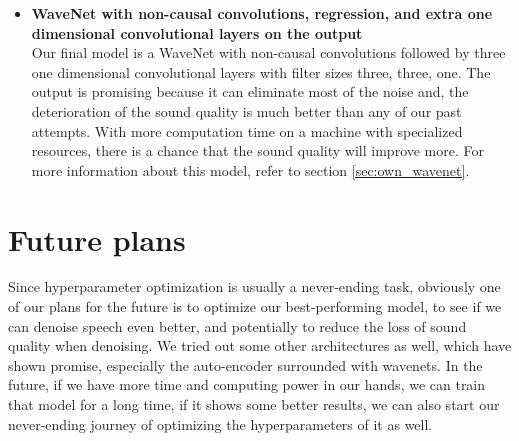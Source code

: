 \documentclass{article}
\begin{document}
\begin{itemize}
	\item \textbf{WaveNet with non-causal convolutions, regression, and extra one dimensional convolutional layers on the output} \\
	Our final model is a WaveNet with non-causal convolutions followed by three one dimensional convolutional layers with filter sizes three, three, one. The output is promising because it can eliminate most of the noise and, the deterioration of the sound quality is much better than any of our past attempts. With more computation time on a machine with specialized resources, there is a chance that the sound quality will improve more. For more information about this model, refer to section \ref{sec:own_wavenet}.
	
	\end{itemize}


	
		
	
	\section{Future plans}
	Since hyperparameter optimization is usually a never-ending task, obviously one of our plans for the future is to optimize our best-performing model, to see if we can denoise speech even better, and potentially to reduce the loss of sound quality when denoising.
	We tried out some other architectures as well, which have shown promise, especially the auto-encoder surrounded with wavenets. In the future, if we have more time and computing power in our hands, we can train that model for a long time, if it shows some better results, we can also start our never-ending journey of optimizing the hyperparameters of it as well.
	
	
	\newpage
	\printbibliography
\end{document}
